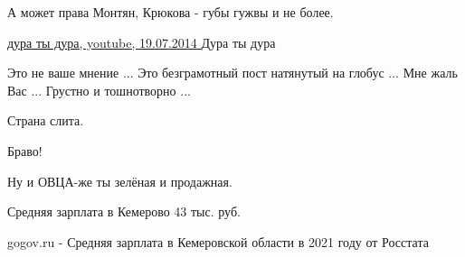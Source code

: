 \begin{itemize}
А может права Монтян, Крюкова - губы гужвы и не более.

 
\href{https://youtu.be/bw24yec61B4}{%
дура ты дура, youtube, 19.07.2014%
}
Дура ты дура

 

Это не ваше мнение ... Это безграмотный пост натянутый на глобус ... Мне жаль
Вас ... Грустно и тошнотворно ...

 
Страна слита.

 
Браво!

 
Ну и ОВЦА-же ты зелёная и продажная.

 
Средняя зарплата в Кемерово 43 тыс. руб.

gogov.ru - Средняя зарплата в Кемеровской области в 2021 году от Росстата

 

\end{itemize}
